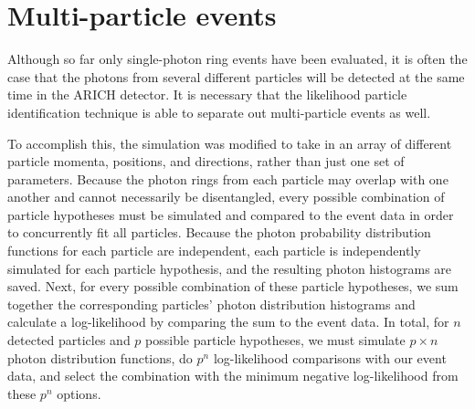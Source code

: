 \begin{figure}[]
\centering
{}
\caption[\TODO{}]{}
\label{fig:angleSeps}
\end{figure}

\section{Multi-particle events}
\label{sec:multiparticle}
Although so far only single-photon ring events have been evaluated, it is often the case that the photons from several different particles will be detected at the same time in the ARICH detector.
It is necessary that the likelihood particle identification technique is able to separate out multi-particle events as well. 

To accomplish this, the simulation was modified to take in an array of different particle momenta, positions, and directions, rather than just one set of parameters.
Because the photon rings from each particle may overlap with one another and cannot necessarily be disentangled, every possible combination of particle hypotheses must be simulated and compared to the event data in order to concurrently fit all particles.
Because the photon probability distribution functions for each particle are independent, each particle is independently simulated for each particle hypothesis, and the resulting photon histograms are saved.
Next, for every possible combination of these particle hypotheses, we sum together the corresponding particles' photon distribution histograms and calculate a log-likelihood by comparing the sum to the event data.
In total, for $n$ detected particles and $p$ possible particle hypotheses, we must simulate $p \times n$ photon distribution functions, do $p^n$  log-likelihood comparisons with our event data, and select the combination with the minimum negative log-likelihood from these $p^n$ options. 

